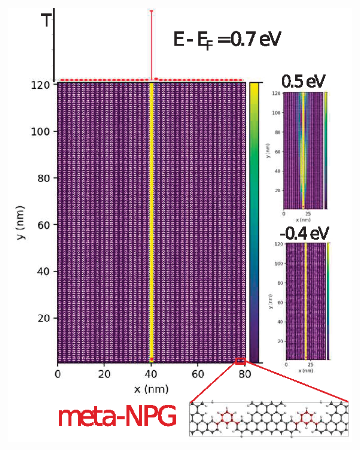 \begin{figure}[h]
\begin{subfigure}[b]{.45\textwidth}
	    \includegraphics[width=\textwidth]{Figures/Fig_3meta.eps}
	    \caption{}
	    \label{studyfig3}
	\end{subfigure}
	\quad
	\begin{subfigure}[b]{.45\textwidth}
        \centering

\end{subfigure}
\end{figure}
